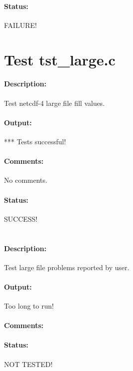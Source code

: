 \paragraph{Status:} FAILURE!

\section{Test tst\_large.c}

\paragraph{Description:} Test netcdf-4 large file fill values.

\paragraph{Output:} *** Tests successful!

\paragraph{Comments:} No comments.

\paragraph{Status:} SUCCESS!

\section{}

\paragraph{Description:} Test large file problems reported by user.

\paragraph{Output:} Too long to run!

\paragraph{Comments:}

\paragraph{Status:} NOT TESTED!

